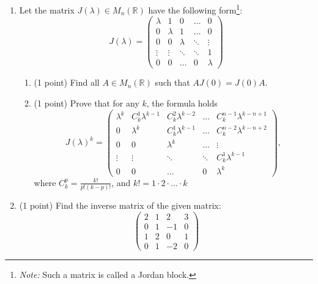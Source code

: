 \documentclass{article}
\begin{document}
\begin{enumerate}
  \item Let the matrix $J(\lambda) \in M_n(\mathbb{R})$ have the following form\footnote{\textit{Note:} Such a matrix is called a Jordan block.}:
  \begin{equation*}
    J(\lambda) = \begin{pmatrix}
      \lambda & 1      & 0         & \dots  & 0       \\
      0       & \lambda & 1        & \dots  & 0       \\
      0       & 0       & \lambda  & \ddots  & \vdots \\
      \vdots  & \vdots  & \ddots & \ddots & 1 \\
      0       & 0      &  \dots  & 0  & \lambda
    \end{pmatrix}
  \end{equation*}
  \begin{enumerate}[label=(\alph*)]
    \item (1 point) Find all $A \in M_n(\mathbb{R})$ such that $AJ(0) = J(0)A$.
    \item (1 point) Prove that for any $k$, the formula holds
    \begin{equation*}
      J(\lambda)^k = \begin{pmatrix}
        \lambda^k & C^1_{k}\lambda^{k-1} & C^2_{k}\lambda^{k-2} & \dots & C^{n-1}_{k}\lambda^{k-n+1} \\
        0 & \lambda^k & C^1_{k}\lambda^{k-1} & \dots & C^{n-2}_{k}\lambda^{k-n+2} \\
        0 & 0 & \lambda^k & \dots & \vdots \\
        \vdots & \vdots & \ddots & \ddots & C^1_{k}\lambda^{k-1} \\
        0 & 0 & \dots & 0 & \lambda^k
      \end{pmatrix},
    \end{equation*}
    where $C^p_{k} = \frac{k!}{p!(k-p)!}$, and $k! = 1 \cdot 2 \cdot \hdots \cdot k$
  \end{enumerate}

  \item (1 point) Find the inverse matrix of the given matrix:
  \begin{equation*}
    \begin{pmatrix}
      2 & 1 & 2 & 3 \\
      0 & 1 & -1 & 0 \\
      1 & 2 & 0 & 1 \\
      0 & 1 & -2 & 0
    \end{pmatrix}
  \end{equation*}


\end{enumerate}
\end{document}
